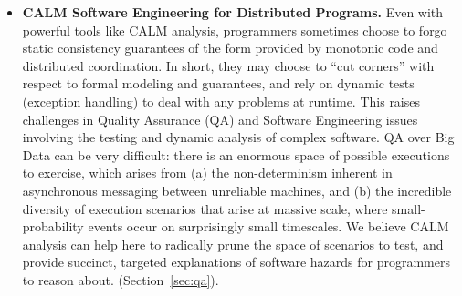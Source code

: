 \begin{itemize}
  \item \textbf{CALM Software Engineering for Distributed Programs.}  Even with powerful tools like CALM analysis, programmers sometimes choose to forgo static consistency guarantees of the form provided by monotonic code and distributed coordination.  In short, they may choose to ``cut corners'' with respect to formal modeling and guarantees, and rely on dynamic tests (exception handling) to deal with any problems at runtime.  This raises challenges in Quality Assurance (QA) and Software Engineering issues involving the testing and dynamic analysis of complex software.  QA over Big Data can be very difficult: there is an enormous space of possible executions to exercise, which arises from (a) the non-determinism inherent in asynchronous messaging between unreliable machines, and (b) the incredible diversity of execution scenarios that arise at massive scale, where small-probability events occur on surprisingly small timescales.  We believe CALM analysis can help here to radically prune the space of scenarios to test, and provide succinct, targeted explanations of software hazards for programmers to reason about.  (Section~\ref{sec:qa}).
\end{itemize}

